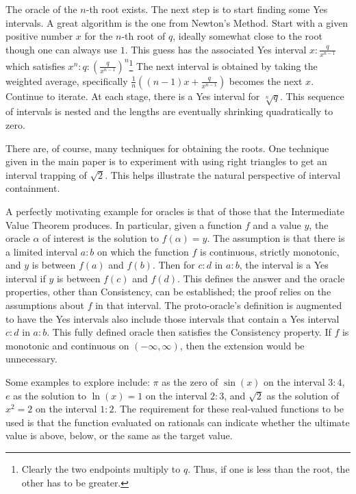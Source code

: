 \documentclass[12pt]{article}
\theoremstyle{remark}
\begin{document}
The oracle of the $n$-th root exists. The next step is to start finding some Yes intervals. A great algorithm is the one from Newton's Method. Start with a given positive number $x$ for the $n$-th root of $q$, ideally somewhat close to the root though one can always use $1$. This guess has the associated Yes interval $x:\frac{q}{x^{n-1}}$ which satisfies $x^n : q : (\frac{q}{x^{n-1}})^n$\footnote{Clearly the two endpoints multiply to $q$. Thus, if one is less than the root, the other has to be greater.} The next interval is obtained by taking the weighted average, specifically $\frac{1}{n}( (n-1) x + \frac{q}{x^{n-1}} )$ becomes the next $x$. Continue to iterate. At each stage, there is a Yes interval for $\sqrt[n]{q}$. This sequence of intervals is nested and the lengths are eventually shrinking quadratically to zero.  

There are, of course, many techniques for obtaining the roots. One technique given in the main paper is to experiment with using right triangles to get an interval trapping of $\sqrt{2}$. This helps illustrate the natural perspective of interval containment.  

A perfectly motivating example for oracles is that of those that the Intermediate Value Theorem produces. In particular, given a function $f$ and a value $y$, the oracle $\alpha$ of interest is the solution to $f(\alpha) = y$. The assumption is that there is a limited interval $a:b$ on which the function $f$ is continuous, strictly monotonic, and $y$ is between $f(a)$ and $f(b)$. Then for $c:d$ in $a:b$, the interval is a Yes interval if $y$ is between $f(c)$ and $f(d)$. This defines the answer and the oracle properties, other than Consistency, can be established; the proof relies on the assumptions about $f$ in that interval. The proto-oracle's definition is augmented to have the Yes intervals also include those intervals that contain a Yes interval $c:d$ in $a:b$. This fully defined oracle then satisfies the Consistency property. If $f$ is monotonic and continuous on $(-\infty, \infty)$, then the extension would be unnecessary.  

Some examples to explore include: $\pi$ as the zero of $\sin(x)$ on the interval $3:4$, $e$ as the solution to  $\ln(x)=1$ on the interval $2:3$, and $\sqrt{2}$ as the solution of $x^2 = 2$ on the interval $1:2$. The requirement for these real-valued functions to be used is that the function evaluated on rationals can indicate whether the ultimate value is above, below, or the same as the target value. 
\end{document}
